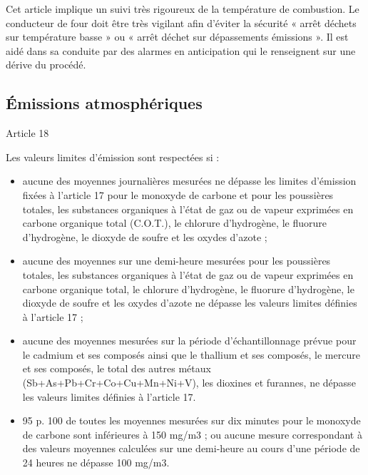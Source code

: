 \vspace{0.3cm}

Cet article implique un suivi très rigoureux de la température de combustion. Le conducteur de four doit être très vigilant afin d’éviter la sécurité « arrêt déchets sur température basse » ou « arrêt déchet sur dépassements émissions ».
Il est aidé dans sa conduite par des alarmes en anticipation qui le renseignent sur une dérive du procédé.


\subsection{Émissions atmosphériques}
\vspace{0.3cm}

Article 18
\vspace{0.3cm}
\begin{tcolorbox}[colback=blue!5!white,colframe=blue!75!black]
Les valeurs limites d'émission sont respectées si : 
\begin{itemize}
\item aucune des moyennes journalières mesurées ne dépasse les limites d’émission fixées à l’article 17 pour le monoxyde de carbone et pour les poussières totales, les substances organiques à l’état de gaz ou de vapeur exprimées en carbone organique total (C.O.T.), le chlorure d’hydrogène, le fluorure d’hydrogène, le dioxyde de soufre et les oxydes d’azote ;
\item aucune des moyennes sur une demi-heure mesurées pour les poussières totales, les substances organiques à l’état de gaz ou de vapeur exprimées en carbone organique total, le chlorure d’hydrogène, le fluorure d’hydrogène, le dioxyde de soufre et les oxydes d’azote ne dépasse les valeurs limites définies à l’article 17 ;
\item aucune des moyennes mesurées sur la période d’échantillonnage prévue pour le cadmium et ses composés ainsi que le thallium et ses composés, le mercure et ses composés, le total des autres métaux (Sb+As+Pb+Cr+Co+Cu+Mn+Ni+V), les dioxines et furannes, ne dépasse les valeurs limites définies à l’article 17.
\item  95 p. 100 de toutes les moyennes mesurées sur dix minutes pour le monoxyde de carbone sont inférieures à 150 mg/m3 ; ou aucune mesure correspondant à des valeurs moyennes calculées sur une demi-heure au cours d’une période de 24 heures ne dépasse 100 mg/m3.
\end{itemize}
\end{tcolorbox}

